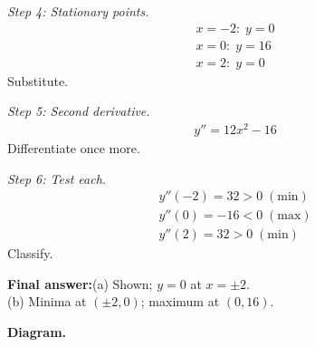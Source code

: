 \documentclass[11pt]{article}
\begin{document}
\textit{Step 4: Stationary points.}
\[\begin{gathered}
x = -2: \; y = 0 \\ x = 0: \; y = 16 \\ x = 2: \; y = 0
\end{gathered}\]
Substitute.

\textit{Step 5: Second derivative.}
\[\begin{gathered}
y'' = 12x^2 - 16
\end{gathered}\]
Differentiate once more.

\textit{Step 6: Test each.}
\[\begin{gathered}
y''(-2) = 32 > 0\; (\text{min}) \\ y''(0) = -16 < 0\; (\text{max}) \\ y''(2) = 32 > 0\; (\text{min})
\end{gathered}\]
Classify.

\begin{answerbox}
\textbf{Final answer:}\quad (a) Shown; \(\displaystyle  y = 0 \) at \(\displaystyle  x = \pm 2 \). \\[3pt]  (b) Minima at \(\displaystyle  (\pm 2, 0) \); maximum at \(\displaystyle  (0, 16) \).
\end{answerbox}
\textbf{Diagram.}
\end{document}
